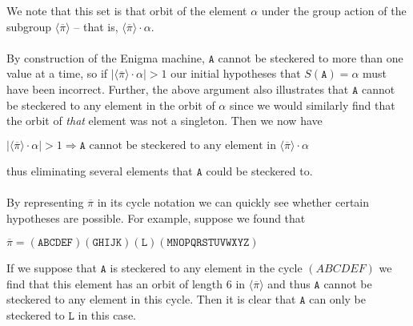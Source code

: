 We note that this set is that orbit of the element $\alpha$ under the
group action of the subgroup $\langle\overline{\pi}\rangle$ -- that is,
$\langle\overline{\pi}\rangle\cdot\alpha$.
\\\\By construction of the Enigma machine, $\texttt{A}$ cannot be steckered to
more than one value at a time, so if
$|\langle\overline{\pi}\rangle\cdot\alpha| > 1$ our initial
hypotheses that $S(\texttt{A}) = \alpha$ must have been incorrect. Further,
the above argument also illustrates that $\texttt{A}$ cannot be steckered to
any element in the orbit of $\alpha$ since
we would similarly find that the orbit of \emph{that} element was not a
singleton. Then we now have
\begin{center}
  $|\langle\overline{\pi}\rangle\cdot\alpha| > 1 \Rightarrow
  \texttt{A} \text{ cannot be steckered to any element in
  }\langle\overline{\pi}\rangle\cdot\alpha$
\end{center}
thus eliminating several elements that $\texttt{A}$ could be steckered to.
\\\\By representing $\overline\pi$ in its cycle notation we can
quickly see whether certain hypotheses are possible. For example,
suppose we found that
\begin{center}
  $\overline\pi =
  (\texttt{ABCDEF})(\texttt{GHIJK})(\texttt{L})(\texttt{MNOPQRSTUVWXYZ})$
\end{center}
If we suppose that $\texttt{A}$ is steckered to any element in the cycle
$(ABCDEF)$ we find that this
element has an orbit of length $6$ in $\langle\overline\pi\rangle$
and thus $\texttt{A}$ cannot be steckered
to any element in this cycle. Then it is clear that $\texttt{A}$ can only be
steckered to $\texttt{L}$ in this case.

